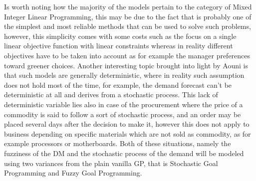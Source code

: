 \begin{doublespace}
Is worth noting how the majority of the models pertain to the category of Mixed Integer Linear Programming, this may be due to the fact that is probably one of the simplest and most reliable methods that can be used to solve such problems, however, this simplicity comes with some costs such as the focus on a single linear objective function with linear constraints whereas in reality different objectives have to be taken into account as for example the manager preferences toward greener choices. Another interesting topic brought into light by Aouni \cite{Azimian2017} is that such models are generally deterministic, where in reality such assumption does not hold most of the time, for example, the demand forecast can't be deterministic at all and derives from a stochastic process. This lack of deterministic variable lies also in case of the procurement where the price of a commodity is said to follow a sort of stochastic process, and an order may be placed several days after the decision to make it, however this does not apply to business depending on specific materials which are not sold as commodity, as for example processors or motherboards. Both of these situations, namely the fuzziness of the DM and the stochastic process of the demand will be modeled using two variances from the plain vanilla GP, that is Stochastic Goal Programming and Fuzzy Goal Programming.


\end{doublespace}
